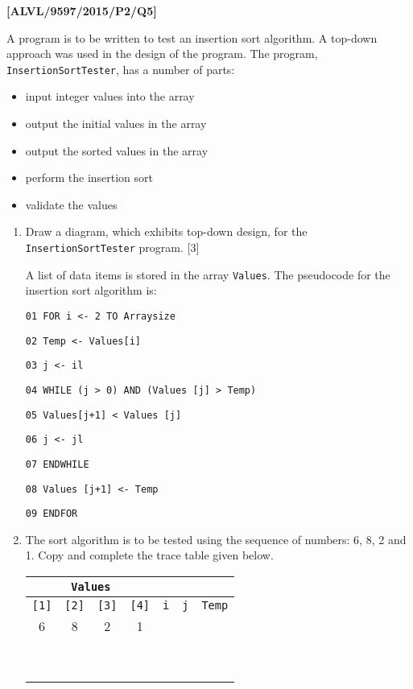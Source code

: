 \item \textbf{{[}ALVL/9597/2015/P2/Q5{]} }

A program is to be written to test an insertion sort algorithm. A
top-down approach was used in the design of the program. The program,
\texttt{InsertionSortTester}, has a number of parts: 
\begin{itemize}
\item input integer values into the array 
\item output the initial values in the array 
\item output the sorted values in the array
\item perform the insertion sort 
\item validate the values 
\end{itemize}
\begin{enumerate}
\item Draw a diagram, which exhibits top-down design, for the \texttt{InsertionSortTester}
program. \hfill{}{[}3{]}

A list of data items is stored in the array \texttt{Values}. The pseudocode
for the insertion sort algorithm is: 

\noindent\begin{minipage}[t]{1\columnwidth}%
\texttt{01 FOR i <- 2 TO Arraysize }

\texttt{02 \qquad{}Temp <- Values{[}i{]} }

\texttt{03 \qquad{}j <- i\textemdash l }

\texttt{04 \qquad{}WHILE (j > 0) AND (Values {[}j{]} > Temp) }

\texttt{05 \qquad{}\qquad{}Values{[}j+1{]} <\textemdash{} Values
{[}j{]} }

\texttt{06 \qquad{}\qquad{}j <- j\textemdash l }

\texttt{07 \qquad{}\qquad{}ENDWHILE }

\texttt{08 \qquad{}\qquad{}Values {[}j+1{]} <- Temp }

\texttt{09 ENDFOR }%
\end{minipage}
\item The sort algorithm is to be tested using the sequence of numbers:
6, 8, 2 and 1. Copy and complete the trace table given below. 
\begin{center}
\begin{tabular}{|c|c|c|c||c|c|c|}
\hline 
\multicolumn{4}{|c||}{\texttt{Values}} &  &  & \tabularnewline
\hline 
\texttt{{[}1{]}} & \texttt{{[}2{]}} & \texttt{{[}3{]}} & \texttt{{[}4{]}} & \texttt{i} & \texttt{j} & \texttt{Temp}\tabularnewline
\hline 
\hline 
6 & 8 & 2 & 1 &  &  & \tabularnewline
\hline 
 &  &  &  &  &  & \tabularnewline
\hline 
 &  &  &  &  &  & \tabularnewline
\hline 
 &  &  &  &  &  & \tabularnewline
\hline 
 &  &  &  &  &  & \tabularnewline
\hline 
 &  &  &  &  &  & \tabularnewline
\hline 
 &  &  &  &  &  & \tabularnewline
\hline 
 &  &  &  &  &  & \tabularnewline
\hline 
 &  &  &  &  &  & \tabularnewline
\hline 
 &  &  &  &  &  & \tabularnewline
\end{tabular}
\par\end{center}


\end{enumerate}
